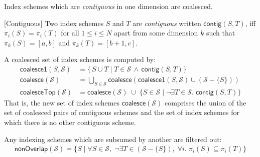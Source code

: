 \begin{description}[leftmargin=0.5em]

\item[Coalesce intervals]
%
Index schemes which are \emph{contiguous} in one dimension are
coalesced.

\newcommand{\contig}[2]{\mathsf{contig}(#1, #2)}
\begin{defn}{[Contiguous]}
Two index schemes $S$ and $T$ are \emph{contiguous}
written $\contig{S}{T}$,
iff $\pi_i(S) = \pi_i(T)$
for all $1 \leq i \leq N$ apart from some dimension $k$ such that
$\pi_k(S) = [a, b]$ and $\pi_k(T) = [b+1, c]$.
\end{defn}
%
A coalesced set of index schemes is computed by:%
\begin{align*}
\mathsf{coalesce1}(S, \mathcal{S}) & =
 \{\,S \cup T \mid
T \in \mathcal{S} \, \wedge \,
\contig{S}{T} \} \\
\mathsf{coalesce}(\mathcal{S}) & =
\bigcup_{S \in \mathcal{S}} \mathsf{coalesce}(
\mathsf{coalesce1}(S, \mathcal{S})
\cup (\mathcal{S} - \{S\})) \\
\mathsf{coalesceTop}(\mathcal{S}) & =
 \mathsf{coalesce}(\mathcal{S})
\; \cup \;
\{ S \in \mathcal{S} \mid \neg \exists T \in \mathcal{S} . \; \contig{S}{T}\}
\end{align*}
%
That is, the new set of index schemes $\mathsf{coalesce}(\mathcal{S})$
comprises the union of the set of coalesced pairs of contiguous
schemes and the set of index schemes for which there is no other
contiguous scheme.

\item[Remove redundant schemes]
Any indexing schemes which are subsumed by another are filtered out:
%
\begin{align*}
\textsf{nonOverlap}(\mathcal{S}) =
\{S \mid \forall S \in \mathcal{S}, \; \neg \exists T \in (\mathcal{S} -
  \{S\}), \; \forall i . \; \pi_i(S) \subseteq \pi_i(T) \}
\end{align*}
%
\end{description}

